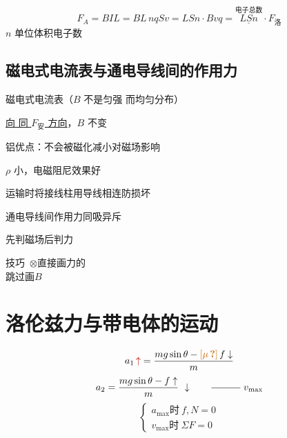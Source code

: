 \[
F_A=BIL=BL\,nqSv=LSn\cdot Bvq=\overset{\text{电子总数}}{\underline{LSn}}\cdot F_{\text{洛}}
\]
$n$ 单位体积电子数

\subsection{磁电式电流表与通电导线间的作用力}
磁电式电流表（$B$ 不是匀强 而均匀分布）

\underline{向 同 $F_{\text{安}}$ 方向}，$B$ 不变

铝优点：不会被磁化\quad 减小对磁场影响

$\rho$ 小，电磁阻尼效果好 %

运输时将接线柱用导线相连防损坏 %

通电导线间作用力\quad 同吸异斥

先判磁场后判力

技巧\ $\otimes$\qquad 直接画力的\\
跳过画$B$


\section{洛伦兹力与带电体的运动}
\[ a_1\,\red{\uparrow}=\dfrac{mg\sin\theta-\unclear{\mu}\,f\downarrow}{m} \]
\[ a_2=\dfrac{mg\sin\theta-f\uparrow}{m}\ \downarrow\qquad \rule[0.5ex]{3em}{0.4pt}\ v_{\max} \]
\[ \left\{\begin{array}{l} a_{\max}\text{时}\ f,N=0\\[2pt] v_{\max}\text{时}\ \Sigma F=0 \end{array}\right. \]


